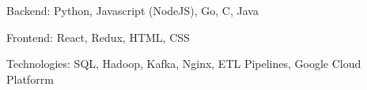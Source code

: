 

\begin{cventries}

    \begin{cvitems} %
        \item {Backend: 
        Python,
        Javascript (NodeJS),
        Go,
        C,
        Java}
        \item{
        Frontend:
        React,
        Redux,
        HTML,
        CSS}
        \item{
        Technologies: 
        SQL,
	    Hadoop,
        Kafka,
        Nginx,
	    ETL Pipelines,
	    Google Cloud Platforrm
        }
      \end{cvitems}
\end{cventries}
